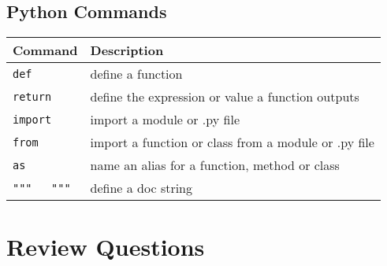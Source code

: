 \documentclass{book}
\newcommand{\passthrough}[1]{#1}
\begin{document}
    




    
        \hypertarget{python-commands}{%
\subsection{Python Commands}\label{python-commands}}

\begin{longtable}[]{@{}ll@{}}
\toprule
Command & Description\tabularnewline
\midrule
\endhead
\passthrough{\lstinline!def!} & define a function\tabularnewline
\passthrough{\lstinline!return!} & define the expression or value a
function outputs\tabularnewline
\passthrough{\lstinline!import!} & import a module or .py
file\tabularnewline
\passthrough{\lstinline!from!} & import a function or class from a
module or .py file\tabularnewline
\passthrough{\lstinline!as!} & name an alias for a function, method or
class\tabularnewline
\passthrough{\lstinline!"""   """!} & define a doc string\tabularnewline
\bottomrule
\end{longtable}
    




    
        \hypertarget{review-questions}{%
\section{Review Questions}\label{review-questions}}
    
\end{document}
